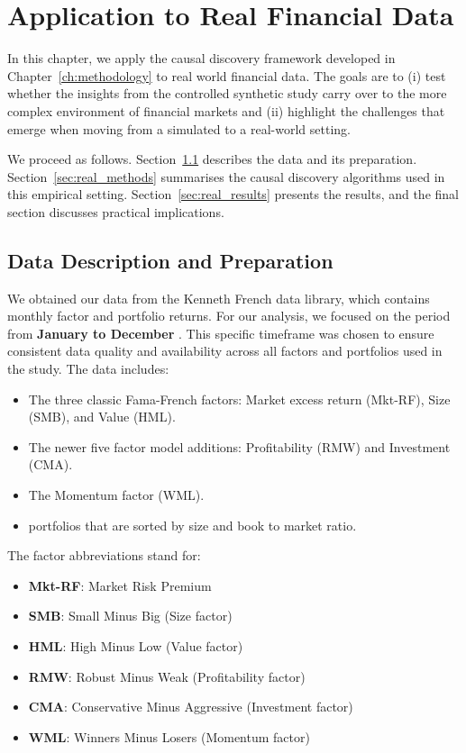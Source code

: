 \chapter{Application to Real Financial Data}
\label{ch:realdata}

In this chapter, we apply the causal discovery framework developed in Chapter~\ref{ch:methodology} to real world financial data. The goals are to (i) test whether the insights from the controlled synthetic study carry over to the more complex environment of financial markets and (ii) highlight the challenges that emerge when moving from a simulated to a real-world setting.

We proceed as follows. Section~\ref{sec:real_data_description} describes the data and its preparation. Section~\ref{sec:real_methods} summarises the causal discovery algorithms used in this empirical setting. Section~\ref{sec:real_results} presents the results, and the final section discusses practical implications.

\section{Data Description and Preparation}
\label{sec:real_data_description}

We obtained our data from the Kenneth French data library, which contains monthly factor and portfolio returns. For our analysis, we focused on the period from \textbf{January \RealStartDate{} to December \RealEndDate{}}. This specific timeframe was chosen to ensure consistent data quality and availability across all factors and portfolios used in the study. The data includes:
\begin{itemize}
    \item The three classic Fama-French factors: Market excess return (Mkt-RF), Size (SMB), and Value (HML).
    \item The newer five factor model additions: Profitability (RMW) and Investment (CMA).
    \item The Momentum factor (WML).
    \item \RealNumPortfolios{} portfolios that are sorted by size and book to market ratio.
\end{itemize}

The factor abbreviations stand for:
\begin{itemize}
    \itemsep0em
    \item \textbf{Mkt-RF}: Market Risk Premium
    \item \textbf{SMB}: Small Minus Big (Size factor)
    \item \textbf{HML}: High Minus Low (Value factor)
    \item \textbf{RMW}: Robust Minus Weak (Profitability factor)
    \item \textbf{CMA}: Conservative Minus Aggressive (Investment factor)
    \item \textbf{WML}: Winners Minus Losers (Momentum factor)
\end{itemize}

